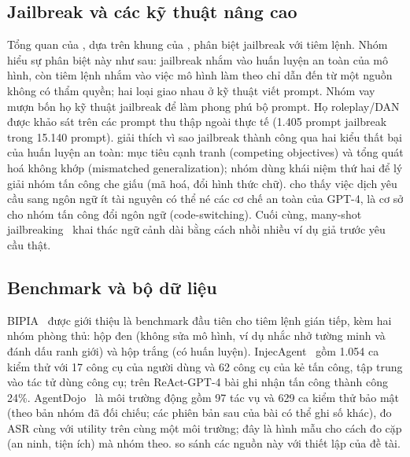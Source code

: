 \subsection{Jailbreak và các kỹ thuật nâng cao}
Tổng quan của \citet{xu2025survey}, dựa trên khung của \citet{liu2024formalizing}, phân biệt jailbreak với tiêm lệnh. Nhóm hiểu sự phân biệt này như sau: jailbreak nhắm vào huấn luyện an toàn của mô hình, còn tiêm lệnh nhắm vào việc mô hình làm theo chỉ dẫn đến từ một nguồn không có thẩm quyền; hai loại giao nhau ở kỹ thuật viết prompt. Nhóm vay mượn bốn họ kỹ thuật jailbreak để làm phong phú bộ prompt. Họ roleplay/DAN được \citet{shen2024dan} khảo sát trên các prompt thu thập ngoài thực tế (1.405 prompt jailbreak trong 15.140 prompt). \citet{wei2023jailbroken} giải thích vì sao jailbreak thành công qua hai kiểu thất bại của huấn luyện an toàn: mục tiêu cạnh tranh (competing objectives) và tổng quát hoá không khớp (mismatched generalization); nhóm dùng khái niệm thứ hai để lý giải nhóm tấn công che giấu (mã hoá, đổi hình thức chữ). \citet{yong2023lowresource} cho thấy việc dịch yêu cầu sang ngôn ngữ ít tài nguyên có thể né các cơ chế an toàn của GPT-4, là cơ sở cho nhóm tấn công đổi ngôn ngữ (code-switching). Cuối cùng, many-shot jailbreaking~\citep{anil2024manyshot} khai thác ngữ cảnh dài bằng cách nhồi nhiều ví dụ giả trước yêu cầu thật.

\subsection{Benchmark và bộ dữ liệu}
BIPIA~\citep{yi2025bipia} được giới thiệu là benchmark đầu tiên cho tiêm lệnh gián tiếp, kèm hai nhóm phòng thủ: hộp đen (không sửa mô hình, ví dụ nhắc nhở tường minh và đánh dấu ranh giới) và hộp trắng (có huấn luyện). InjecAgent~\citep{zhan2024injecagent} gồm 1.054 ca kiểm thử với 17 công cụ của người dùng và 62 công cụ của kẻ tấn công, tập trung vào tác tử dùng công cụ; trên ReAct-GPT-4 bài ghi nhận tấn công thành công 24\%. AgentDojo~\citep{debenedetti2024agentdojo} là môi trường động gồm 97 tác vụ và 629 ca kiểm thử bảo mật (theo bản nhóm đã đối chiếu; các phiên bản sau của bài có thể ghi số khác), đo ASR cùng với utility trên cùng một môi trường; đây là hình mẫu cho cách đo cặp (an ninh, tiện ích) mà nhóm theo.  so sánh các nguồn này với thiết lập của đề tài.

